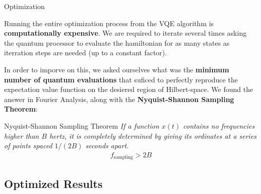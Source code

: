 \documentclass[9pt, handout, aspectratio=169]{beamer}		%
\begin{document}
\begin{frame}{Optimization}

	Running the entire optimization process from the VQE algorithm is \textbf{computationally expensive}. We are required to iterate several times asking the quantum processor to evaluate the hamiltonian for as many states as iterration steps are needed (up to a constant factor).

	\medskip

	In order to imporve on this, we asked ourselves what was the \textbf{minimum number of quantum evaluations} that suficed to perfectly reproduce the expectation value function on the desiered region of Hilbert-space. We found the answer in Fourier Analysis, along with the \textbf{Nyquist-Shannon Sampling Theorem}:

	\begin{block}{Nyquist-Shannon Sampling Theorem}
		\emph{If a function $x(t)$ contains no frequencies higher than $B$ hertz, it is completely determined by giving its ordinates at a series of points spaced $1/(2B)$ seconds apart.}
		\medskip
		\begin{align*}
			f_{\text{sampling}} > 2B
		\end{align*}
	\end{block}

\end{frame}


	\subsection{Optimized Results}
\end{document}
